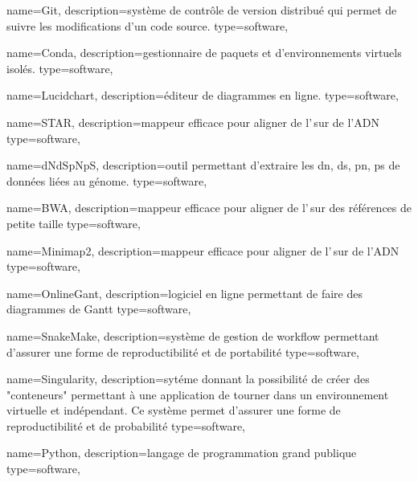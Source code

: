  {
    name=Git,
    description={système de contrôle de version distribué qui permet de suivre les modifications d'un code source. \cite{git}}
    type=software,
}

 {
    name=Conda,
    description={gestionnaire de paquets et d'environnements virtuels isolés. \cite{conda}}
    type=software,
}
\newcommand{\Conda}{\gls{Conda}}


 {
    name=Lucidchart,
    description={éditeur de diagrammes en ligne.\cite{lucidchart}}
    type=software, 
}

 {
    name=STAR,
    description={\gls{mappeur} efficace pour aligner de l'\ARN\,sur de l'ADN \cite{star}}
     type=software,
}

 {
    name=dNdSpNpS,
    description={outil permettant d'extraire les \acrshort{dn}, \acrshort{ds}, \acrshort{pn}, \acrshort{ps} de données liées au génome. \cite{dNdSpNpS}}
     type=software,
}

 {
    name=BWA,
    description={\gls{mappeur} efficace pour aligner de l'\ARN\,sur des références de petite taille \cite{bwa}}
     type=software,
}
\newcommand{\BWA}{\gls{BWA}}

 {
    name=Minimap2,
    description={\gls{mappeur} efficace pour aligner de l'\ARN\,sur de l'ADN \cite{minimap2}}
     type=software,
}

 {
    name=OnlineGant,
    description={logiciel en ligne permettant de faire des diagrammes de Gantt \cite{gantt}}
     type=software,
}

 {
    name=SnakeMake,
    description={système de gestion de workflow permettant d'assurer une forme de reproductibilité et de portabilité \cite{snakemake} }
     type=software,
}
\newcommand{\SnakeMake}{\gls{SnakeMake}}


 {
    name=Singularity,
    description={sytéme donnant la possibilité de créer des "conteneurs" permettant à une application de tourner dans un environnement virtuelle et indépendant. Ce système permet d'assurer une forme de reproductibilité et de probabilité}
     type=software,
}
\newcommand{\Singularity}{\gls{Singularity}}

 {
    name=Python,
    description={langage de programmation grand publique \cite{python}}
     type=software,
}
\newcommand{\Python}{\gls{Python}}

